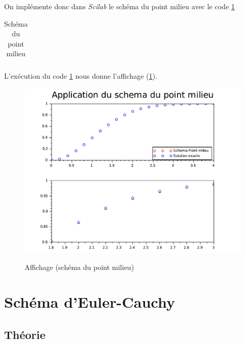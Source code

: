\documentclass[a4paper,10pt]{report}
\begin{document}
On implémente donc dans \textit{Scilab} le schéma du point milieu avec le code \ref{code_pointmilieu}
\begin{table}[H]
\caption{Schéma du point milieu}
\begin{tabular}{l}

\label{code_pointmilieu}
\end{tabular}
\end{table}

L'exécution du code \ref{code_pointmilieu} nous donne l'affichage (\ref{graph_pointmilieu}).
\begin{figure}[H]
\centering
\caption{Affichage (schéma du point milieu)}
\includegraphics[width=\textwidth]{point-milieu.pdf}
\label{graph_pointmilieu}
\end{figure}

\section{Schéma d'Euler-Cauchy}
\subsection{Théorie}
\end{document}
